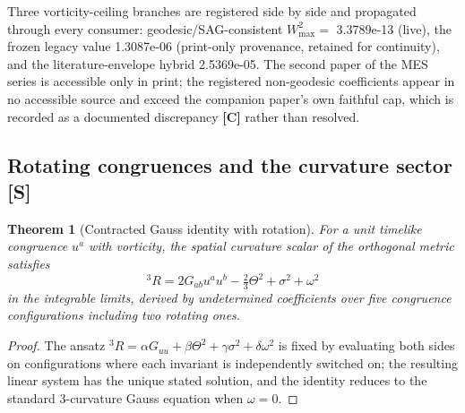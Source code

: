 \documentclass[10pt]{article}
\newtheorem{theorem}{Theorem}[section]
\theoremstyle{definition}
\newcommand{\tier}[1]{\textbf{[#1]}}
\begin{document}
Three vorticity-ceiling branches are registered side by side and
propagated through every consumer:
geodesic/SAG-consistent $W^2_{\max} = $ 3.3789e-13 (live),
the frozen legacy value 1.3087e-06 (print-only provenance,
retained for continuity), and the literature-envelope hybrid
2.5369e-05. The second paper of the MES series is accessible only in
print; the registered non-geodesic coefficients appear in no
accessible source and exceed the companion paper's own faithful cap,
which is recorded as a documented discrepancy \tier{C} rather than
resolved.

\subsection{Rotating congruences and the curvature sector \tier{S}}

\begin{theorem}[Contracted Gauss identity with rotation]
\label{thm:ke}
For a unit timelike congruence $u^a$ with vorticity, the spatial
curvature scalar of the orthogonal metric satisfies
\begin{equation}
{}^3R = 2 G_{ab}u^a u^b - \tfrac{2}{3}\Theta^2 + \sigma^2 + \omega^2
\end{equation}
in the integrable limits, derived by undetermined coefficients over
five congruence configurations including two rotating ones.
\end{theorem}
\begin{proof}
The ansatz ${}^3R = \alpha G_{uu} + \beta\Theta^2 + \gamma\sigma^2 +
\delta\omega^2$ is fixed by evaluating both sides on configurations
where each invariant is independently switched on; the resulting
linear system has the unique stated solution, and the identity reduces
to the standard 3-curvature Gauss equation when $\omega = 0$.
\end{proof}
\end{document}

